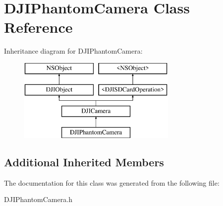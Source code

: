 \hypertarget{interface_d_j_i_phantom_camera}{\section{D\+J\+I\+Phantom\+Camera Class Reference}
\label{interface_d_j_i_phantom_camera}
}
Inheritance diagram for D\+J\+I\+Phantom\+Camera\+:\begin{figure}[H]
\begin{center}
\leavevmode
\includegraphics[height=4.000000cm]{interface_d_j_i_phantom_camera}
\end{center}
\end{figure}
\subsection*{Additional Inherited Members}


The documentation for this class was generated from the following file\+:\begin{DoxyCompactItemize}
\item 
D\+J\+I\+Phantom\+Camera.\+h\end{DoxyCompactItemize}

